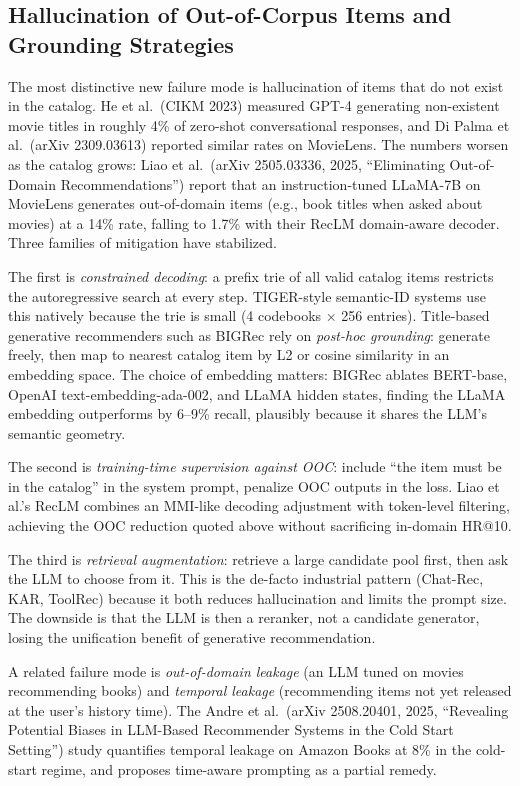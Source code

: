 \documentclass{article}
\begin{document}
\subsection{Hallucination of Out-of-Corpus Items and Grounding Strategies}\label{hallucination-of-out-of-corpus-items-and-grounding-strategies}

The most distinctive new failure mode is hallucination of items that do not exist in the catalog. He et al.~(CIKM 2023) measured GPT-4 generating non-existent movie titles in roughly 4\% of zero-shot conversational responses, and Di Palma et al.~(arXiv 2309.03613) reported similar rates on MovieLens. The numbers worsen as the catalog grows: Liao et al.~(arXiv 2505.03336, 2025, ``Eliminating Out-of-Domain Recommendations'') report that an instruction-tuned LLaMA-7B on MovieLens generates out-of-domain items (e.g., book titles when asked about movies) at a 14\% rate, falling to 1.7\% with their RecLM domain-aware decoder. Three families of mitigation have stabilized.

The first is \emph{constrained decoding}: a prefix trie of all valid catalog items restricts the autoregressive search at every step. TIGER-style semantic-ID systems use this natively because the trie is small (4 codebooks × 256 entries). Title-based generative recommenders such as BIGRec rely on \emph{post-hoc grounding}: generate freely, then map to nearest catalog item by L2 or cosine similarity in an embedding space. The choice of embedding matters: BIGRec ablates BERT-base, OpenAI text-embedding-ada-002, and LLaMA hidden states, finding the LLaMA embedding outperforms by 6--9\% recall, plausibly because it shares the LLM's semantic geometry.

The second is \emph{training-time supervision against OOC}: include ``the item must be in the catalog'' in the system prompt, penalize OOC outputs in the loss. Liao et al.'s RecLM combines an MMI-like decoding adjustment with token-level filtering, achieving the OOC reduction quoted above without sacrificing in-domain HR@10.

The third is \emph{retrieval augmentation}: retrieve a large candidate pool first, then ask the LLM to choose from it. This is the de-facto industrial pattern (Chat-Rec, KAR, ToolRec) because it both reduces hallucination and limits the prompt size. The downside is that the LLM is then a reranker, not a candidate generator, losing the unification benefit of generative recommendation.

A related failure mode is \emph{out-of-domain leakage} (an LLM tuned on movies recommending books) and \emph{temporal leakage} (recommending items not yet released at the user's history time). The Andre et al.~(arXiv 2508.20401, 2025, ``Revealing Potential Biases in LLM-Based Recommender Systems in the Cold Start Setting'') study quantifies temporal leakage on Amazon Books at 8\% in the cold-start regime, and proposes time-aware prompting as a partial remedy.
\end{document}
